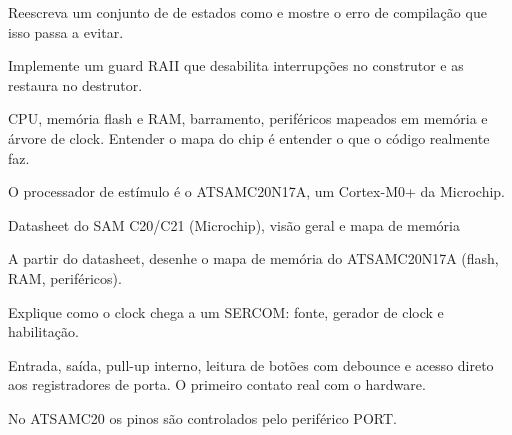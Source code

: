 \begin{paraestudar}
  \item {}
  \item {}
\end{paraestudar}

\begin{pratique}
  \item Reescreva um conjunto de  de estados como  e mostre o erro de compilação que isso passa a evitar.
  \item Implemente um guard RAII que desabilita interrupções no construtor e as restaura no destrutor.
\end{pratique}

CPU, memória flash e RAM, barramento, periféricos mapeados em memória e árvore de clock. Entender o mapa do chip é entender o que o código realmente faz.

\begin{noproduto}
O processador de estímulo é o ATSAMC20N17A, um Cortex-M0+ da Microchip.
\end{noproduto}

\begin{paraestudar}
  \item {}
  \item Datasheet do SAM C20/C21 (Microchip), visão geral e mapa de memória
\end{paraestudar}

\begin{pratique}
  \item A partir do datasheet, desenhe o mapa de memória do ATSAMC20N17A (flash, RAM, periféricos).
  \item Explique como o clock chega a um SERCOM: fonte, gerador de clock e habilitação.
\end{pratique}

Entrada, saída, pull-up interno, leitura de botões com debounce e acesso direto aos registradores de porta. O primeiro contato real com o hardware.

\begin{noproduto}
No ATSAMC20 os pinos são controlados pelo periférico PORT.
\end{noproduto}

